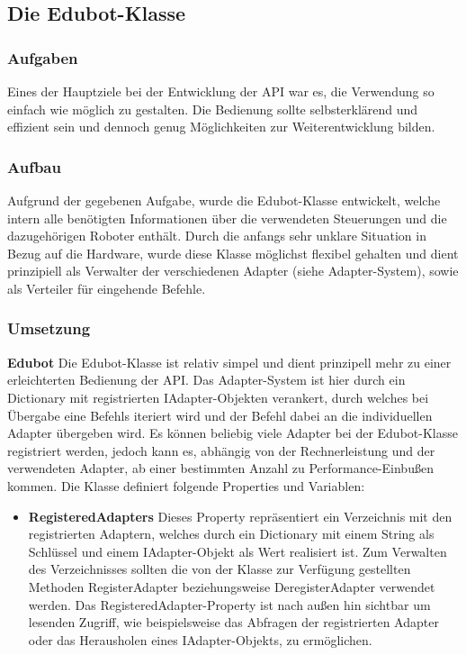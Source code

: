 
\subsection{Die Edubot-Klasse}

\subsubsection{Aufgaben}
Eines der Hauptziele bei der Entwicklung der API war es, die Verwendung so einfach wie möglich zu gestalten. Die Bedienung sollte selbsterklärend und effizient sein und dennoch genug Möglichkeiten zur Weiterentwicklung bilden.

\subsubsection{Aufbau}
Aufgrund der gegebenen Aufgabe, wurde die Edubot-Klasse entwickelt, welche intern alle benötigten Informationen über die verwendeten Steuerungen und die dazugehörigen Roboter enthält. Durch die anfangs sehr unklare Situation in Bezug auf die Hardware, wurde diese Klasse möglichst flexibel gehalten und dient prinzipiell als Verwalter der verschiedenen Adapter (siehe Adapter-System), sowie als Verteiler für eingehende Befehle. 

\subsubsection{Umsetzung}
\textbf{Edubot}
\newline
Die Edubot-Klasse ist relativ simpel und dient prinzipell mehr zu einer erleichterten Bedienung der API. Das Adapter-System ist hier durch ein Dictionary mit registrierten IAdapter-Objekten verankert, durch welches bei Übergabe eine Befehls iteriert wird und der Befehl dabei an die individuellen Adapter übergeben wird. Es können beliebig viele Adapter bei der Edubot-Klasse registriert werden, jedoch kann es, abhängig von der Rechnerleistung und der verwendeten Adapter, ab einer bestimmten Anzahl zu Performance-Einbußen kommen.
Die Klasse definiert folgende Properties und Variablen:
\begin{itemize}
\item \textbf{RegisteredAdapters}
\newline
Dieses Property repräsentiert ein Verzeichnis mit den registrierten Adaptern, welches durch ein Dictionary mit einem String als Schlüssel und einem IAdapter-Objekt als Wert realisiert ist. Zum Verwalten des Verzeichnisses sollten die von der Klasse zur Verfügung gestellten Methoden RegisterAdapter beziehungsweise DeregisterAdapter verwendet werden. Das RegisteredAdapter-Property ist nach außen hin sichtbar um lesenden Zugriff, wie beispielsweise das Abfragen der registrierten Adapter oder das Herausholen eines IAdapter-Objekts, zu ermöglichen. 
\end{itemize}

